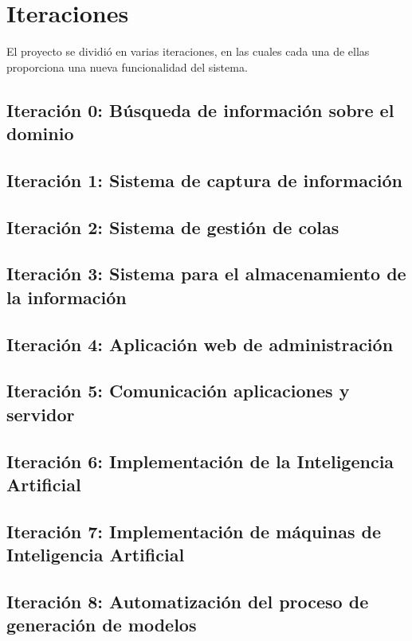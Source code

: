 \section{Iteraciones}
El proyecto se dividió en varias iteraciones, en las cuales cada una de ellas proporciona una nueva funcionalidad del sistema.

\subsection{Iteración 0: Búsqueda de información sobre el dominio}
\subsection{Iteración 1: Sistema de captura de información}
\subsection{Iteración 2: Sistema de gestión de colas}
\subsection{Iteración 3: Sistema para el almacenamiento de la información}
\subsection{Iteración 4: Aplicación web de administración}
\subsection{Iteración 5: Comunicación aplicaciones y servidor}
\subsection{Iteración 6: Implementación de la Inteligencia Artificial}
\subsection{Iteración 7: Implementación de máquinas de Inteligencia Artificial}
\subsection{Iteración 8: Automatización del proceso de generación de modelos}

